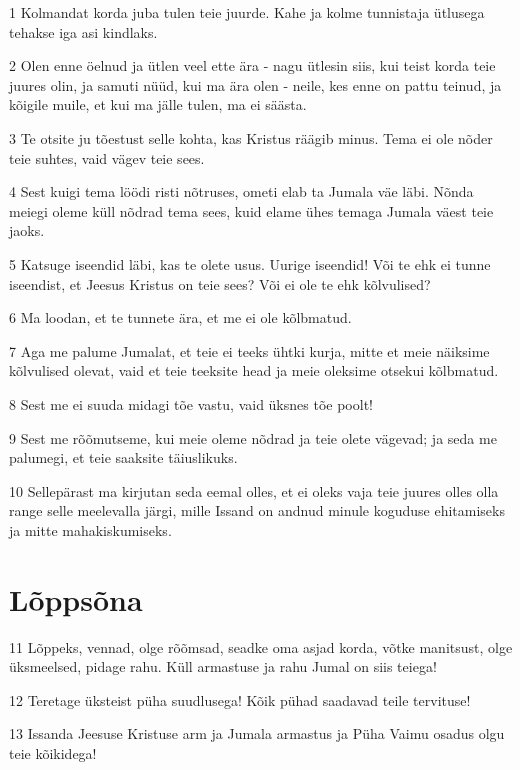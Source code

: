 \par 1 Kolmandat korda juba tulen teie juurde. Kahe ja kolme tunnistaja ütlusega tehakse iga asi kindlaks.
\par 2 Olen enne öelnud ja ütlen veel ette ära - nagu ütlesin siis, kui teist korda teie juures olin, ja samuti nüüd, kui ma ära olen - neile, kes enne on pattu teinud, ja kõigile muile, et kui ma jälle tulen, ma ei säästa.
\par 3 Te otsite ju tõestust selle kohta, kas Kristus räägib minus. Tema ei ole nõder teie suhtes, vaid vägev teie sees.
\par 4 Sest kuigi tema löödi risti nõtruses, ometi elab ta Jumala väe läbi. Nõnda meiegi oleme küll nõdrad tema sees, kuid elame ühes temaga Jumala väest teie jaoks.
\par 5 Katsuge iseendid läbi, kas te olete usus. Uurige iseendid! Või te ehk ei tunne iseendist, et Jeesus Kristus on teie sees? Või ei ole te ehk kõlvulised?
\par 6 Ma loodan, et te tunnete ära, et me ei ole kõlbmatud.
\par 7 Aga me palume Jumalat, et teie ei teeks ühtki kurja, mitte et meie näiksime kõlvulised olevat, vaid et teie teeksite head ja meie oleksime otsekui kõlbmatud.
\par 8 Sest me ei suuda midagi tõe vastu, vaid üksnes tõe poolt!
\par 9 Sest me rõõmutseme, kui meie oleme nõdrad ja teie olete vägevad; ja seda me palumegi, et teie saaksite täiuslikuks.
\par 10 Sellepärast ma kirjutan seda eemal olles, et ei oleks vaja teie juures olles olla range selle meelevalla järgi, mille Issand on andnud minule koguduse ehitamiseks ja mitte mahakiskumiseks.
\section*{Lõppsõna}

\par 11 Lõppeks, vennad, olge rõõmsad, seadke oma asjad korda, võtke manitsust, olge üksmeelsed, pidage rahu. Küll armastuse ja rahu Jumal on siis teiega!
\par 12 Teretage üksteist püha suudlusega! Kõik pühad saadavad teile tervituse!
\par 13 Issanda Jeesuse Kristuse arm ja Jumala armastus ja Püha Vaimu osadus olgu teie kõikidega!





